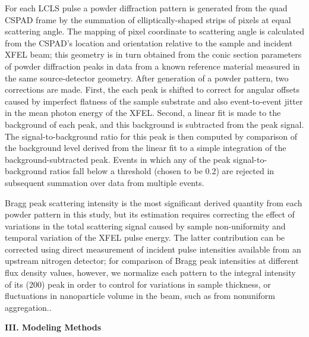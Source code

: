 For each LCLS pulse a powder diffraction pattern is generated from the
quad CSPAD frame by the summation of elliptically-shaped strips of
pixels at equal scattering angle. The mapping of pixel coordinate to
scattering angle is calculated from the CSPAD's location and orientation
relative to the sample and incident XFEL beam; this geometry is in turn
obtained from the conic section parameters of powder diffraction peaks
in data from a known reference material measured in the same
source-detector geometry. After generation of a powder pattern, two
corrections are made. First, the each peak is shifted to correct for
angular offsets caused by imperfect flatness of the sample substrate and
also event-to-event jitter in the mean photon energy of the XFEL.
Second, a linear fit is made to the background of each peak, and this
background is subtracted from the peak signal. The signal-to-background
ratio for this peak is then computed by comparison of the background
level derived from the linear fit to a simple integration of the
background-subtracted peak. Events in which any of the peak
signal-to-background ratios fall below a threshold (chosen to be 0.2)
are rejected in subsequent summation over data from multiple events.

Bragg peak scattering intensity is the most significant derived quantity
from each powder pattern in this study, but its estimation requires
correcting the effect of variations in the total scattering signal
caused by sample non-uniformity and temporal variation of the XFEL pulse
energy. The latter contribution can be corrected using direct
measurement of incident pulse intensities available from an upstream
nitrogen detector; for comparison of Bragg peak intensities at different
flux density values, however, we normalize each pattern to the integral
intensity of its (200) peak in order to control for variations in sample
thickness, or fluctuations in nanoparticle volume in the beam, such as
from nonuniform aggregation..

\textbf{III. Modeling Methods}

